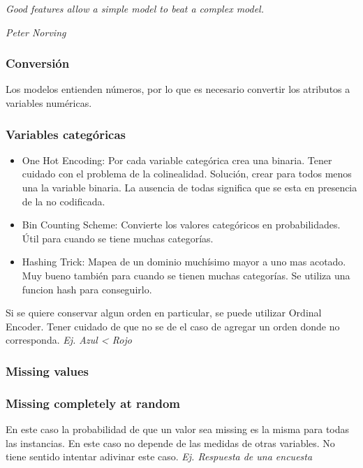 \documentclass[titlepage,a4paper]{article}
\begin{document}
\begin{center}
    \textit{Good features allow a simple model to beat a complex model.}
    
    \textit{Peter Norving}
\end{center}

\subsubsection{Conversión}
Los modelos entienden números, por lo que es necesario convertir los atributos a variables numéricas.



\subsubsection*{Variables categóricas}
\begin{itemize}
    \item One Hot Encoding: Por cada variable categórica crea una binaria. Tener cuidado con el problema de la colinealidad. Solución, crear para todos menos una la variable binaria. La ausencia de todas significa que se esta en presencia de la no codificada.
    \item Bin Counting Scheme: Convierte los valores categóricos en probabilidades. Útil para cuando se tiene muchas categorías.
    \item Hashing Trick: Mapea de un dominio muchísimo mayor a uno mas acotado. Muy bueno también para cuando se tienen muchas categorías. Se utiliza una funcion hash para conseguirlo.
\end{itemize}

Si se quiere conservar algun orden en particular, se puede utilizar Ordinal Encoder. Tener cuidado de que no se de el caso de agregar un orden donde no corresponda. \textit{Ej. Azul < Rojo}


\subsubsection{Missing values}
\subsubsection*{Missing completely at random}
En este caso la probabilidad de que un valor sea missing es la misma para todas las instancias. En este caso no depende de las medidas de otras variables. No tiene sentido intentar adivinar este caso. \textit{Ej. Respuesta de una encuesta}
\end{document}
